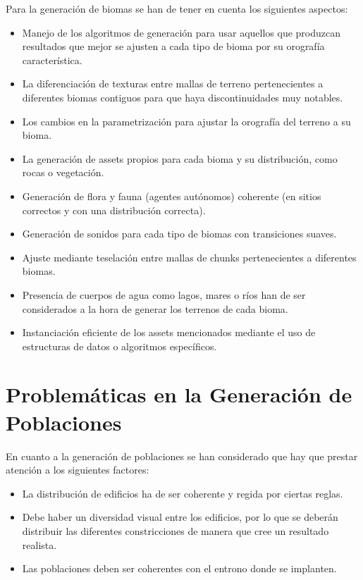 Para la generación de biomas se han de tener en cuenta los siguientes aspectos:
\begin{itemize}
    \item Manejo de los algoritmos de generación para usar aquellos que produzcan resultados que mejor se ajusten a cada tipo de bioma por su orografía característica.
    \item La diferenciación de texturas entre mallas de terreno pertenecientes a diferentes biomas contiguos para que haya discontinuidades muy notables.
    \item Los cambios en la parametrización para ajustar la orografía del terreno a su bioma. 
    \item La generación de assets propios para cada bioma y su distribución, como rocas o vegetación. 
    \item Generación de flora y fauna (agentes autónomos) coherente (en sitios correctos y con una distribución correcta).
    \item Generación de sonidos para cada tipo de biomas con transiciones suaves.
    \item Ajuste mediante teselación entre mallas de chunks pertenecientes a diferentes biomas.
    \item Presencia de cuerpos de agua como lagos, mares o ríos han de ser considerados a la hora de generar los terrenos de cada bioma.
    \item Instanciación eficiente de los assets mencionados mediante el uso de estructuras de datos o algoritmos específicos.
\end{itemize}

\section{Problemáticas en la Generación de Poblaciones}

En cuanto a la generación de poblaciones se han considerado que hay que prestar atención a los siguientes factores:
\begin{itemize}
    \item La distribución de edificios ha de ser coherente y regida por ciertas reglas.
    \item Debe haber un diversidad visual entre los edificios, por lo que se deberán distribuir las diferentes constricciones de manera que cree un resultado realista.
    \item Las poblaciones deben ser coherentes con el entrono donde se implanten.
\end{itemize}

